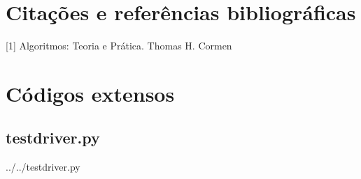 \documentclass[12pt,a4paper,twoside]{report}
\begin{document}
\chapter{Citações e referências bibliográficas}
	[1] Algoritmos: Teoria e Prática. Thomas H. Cormen
		\date{Today}







\clearpage
{}
\appendix

\chapter{Códigos extensos \label{ap:testdriver}}
\section{testdriver.py}
 {../../testdriver.py}
\end{document}
